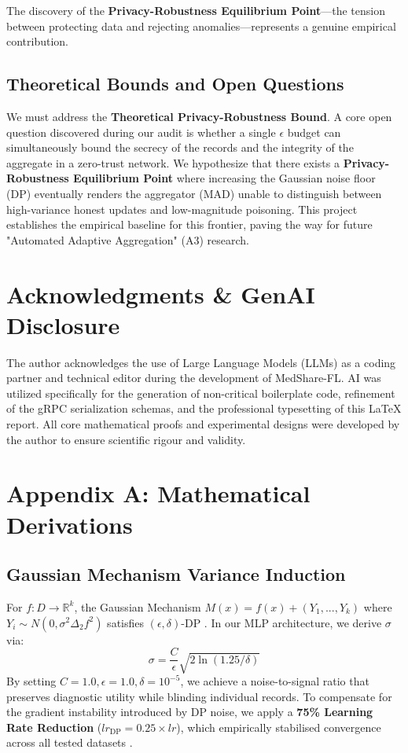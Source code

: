 \documentclass[10pt, a4paper, twocolumn]{article}
\begin{document}
The discovery of the \textbf{Privacy-Robustness Equilibrium Point}—the tension between protecting data and rejecting anomalies—represents a genuine empirical contribution.

\subsection{Theoretical Bounds and Open Questions}
We must address the \textbf{Theoretical Privacy-Robustness Bound}. A core open question discovered during our audit is whether a single $\epsilon$ budget can simultaneously bound the secrecy of the records and the integrity of the aggregate in a zero-trust network. We hypothesize that there exists a \textbf{Privacy-Robustness Equilibrium Point} where increasing the Gaussian noise floor (DP) eventually renders the aggregator (MAD) unable to distinguish between high-variance honest updates and low-magnitude poisoning. This project establishes the empirical baseline for this frontier, paving the way for future "Automated Adaptive Aggregation" (A3) research.


\section{Acknowledgments \& GenAI Disclosure}
The author acknowledges the use of Large Language Models (LLMs) as a coding partner and technical editor during the development of MedShare-FL. AI was utilized specifically for the generation of non-critical boilerplate code, refinement of the gRPC serialization schemas, and the professional typesetting of this LaTeX report. All core mathematical proofs and experimental designs were developed by the author to ensure scientific rigour and validity.

\section*{Appendix A: Mathematical Derivations}

\subsection*{Gaussian Mechanism Variance Induction}
For $f: D \to \mathbb{R}^k$, the Gaussian Mechanism $M(x) = f(x) + (Y_1, ..., Y_k)$ where $Y_i \sim N(0, \sigma^2 \Delta_2 f^2)$ satisfies $(\epsilon, \delta)$-DP \cite{dworkroth2014}. In our MLP architecture, we derive $\sigma$ via:
\begin{equation}
    \sigma = \frac{C}{\epsilon} \sqrt{2 \ln(1.25/\delta)}
\end{equation}
By setting $C=1.0, \epsilon=1.0, \delta=10^{-5}$, we achieve a noise-to-signal ratio that preserves diagnostic utility while blinding individual records. To compensate for the gradient instability introduced by DP noise, we apply a \textbf{75\% Learning Rate Reduction} ($lr_{\text{DP}} = 0.25 \times lr$), which empirically stabilised convergence across all tested datasets \cite{hardt2016}.
\end{document}
